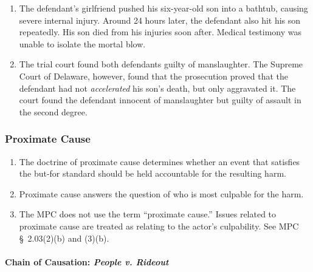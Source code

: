 \begin{enumerate}
    \item The defendant's girlfriend pushed his six-year-old son into a bathtub, causing severe internal injury. Around 24 hours later, the defendant also hit his son repeatedly. His son died from his injuries soon after. Medical testimony was unable to isolate the mortal blow.
    \item The trial court found both defendants guilty of manslaughter. The Supreme Court of Delaware, however, found that the prosecution proved that the defendant had not \emph{accelerated} his son's death, but only aggravated it. The court found the defendant innocent of manslaughter but guilty of assault in the second degree.
\end{enumerate}

\subsubsection{Proximate Cause} 

\begin{enumerate}
    \item The doctrine of proximate cause determines whether an event that satisfies the but-for standard should be held accountable for the resulting harm.
    \item Proximate cause answers the question of who is most culpable for the harm.
    \item The MPC does not use the term ``proximate cause.'' Issues related to proximate cause are treated as relating to the actor's culpability. See MPC § 2.03(2)(b) and (3)(b).
\end{enumerate}

\paragraph{Chain of Causation: \emph{People v. Rideout}}

